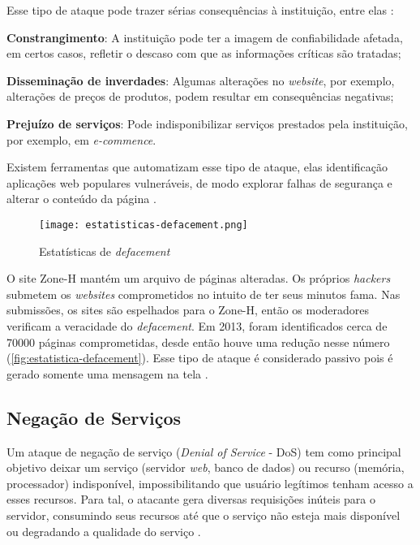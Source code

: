 Esse tipo de ataque pode trazer sérias consequências à instituição, entre elas \cite{esr:tratamento}:

\begin{alineas}
\item \textbf{Constrangimento}: A instituição pode ter a imagem de confiabilidade afetada, em certos casos, refletir o descaso com que as informações críticas são tratadas; 
\item \textbf{Disseminação de inverdades}: Algumas alterações no \textit{website}, por exemplo, alterações de preços de produtos, podem resultar em consequências negativas; 
\item \textbf{Prejuízo de serviços}: Pode indisponibilizar serviços prestados pela instituição, por exemplo, em \textit{e-commence}.
\end{alineas}

Existem ferramentas que automatizam esse tipo de ataque, elas identificação aplicações web populares vulneráveis, de modo explorar falhas de segurança e alterar o conteúdo da página \cite{esr:tratamento}.

\begin{figure}[htb]
 \centering
 \caption{Estatísticas de \textit{defacement}}
 \texttt{[image: estatisticas-defacement.png]}
 \label{fig:estatistica-defacement}
\end{figure}

O site Zone-H mantém um arquivo de páginas alteradas. Os próprios \textit{hackers} submetem os \textit{websites} comprometidos no intuito de ter seus minutos fama. Nas submissões, os sites são espelhados para o Zone-H, então os moderadores verificam a veracidade do \textit{defacement}. Em 2013, foram identificados cerca de 70000 páginas comprometidas, desde então houve uma redução nesse número (\autoref{fig:estatistica-defacement}). Esse tipo de ataque é considerado passivo pois é gerado somente uma mensagem na tela \cite{angelo-xss}.

\subsection{Negação de Serviços} \label{sec:negação}
 
Um ataque de negação de serviço (\textit{Denial of Service} - DoS) tem como principal objetivo deixar um serviço (servidor \textit{web}, banco de dados) ou recurso (memória, processador)  indisponível, impossibilitando que usuário legítimos tenham acesso a esses recursos. Para tal, o atacante gera diversas requisições inúteis para o servidor, consumindo seus recursos até que o serviço não esteja mais disponível ou degradando a qualidade do serviço \cite{cryptsec}.


